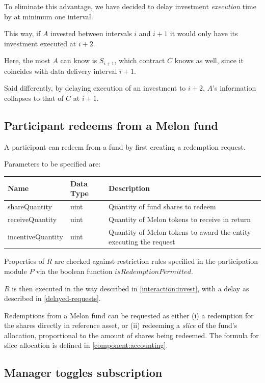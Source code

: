 \documentclass[conference]{IEEEtran}
\begin{document}
To eliminate this advantage, we have decided to delay investment \textit{execution} time by at minimum one interval.

This way, if $A$ invested between intervals $i$ and $i+1$ it would only have its investment executed at $i+2$.

Here, the most $A$ can know is $S_{i+1}$, which contract $C$ knows as well, since it coincides with data delivery interval $i+1$.

Said differently, by delaying execution of an investment to $i+2$, $A$'s information collapses to that of $C$ at $i+1$.

\subsection{Participant redeems from a Melon fund} \label{interaction:redeem}

A participant can redeem from a fund by first creating a redemption request.

Parameters to be specified are:

\begin{center}
		\footnotesize
		\begin{tabular}{ | p{2cm} | p{1.2cm} | p{4cm} | }
		\hline
		Name & Data Type & Description \\ \hline
		shareQuantity & uint & Quantity of fund shares to redeem \\ \hline
		receiveQuantity & uint & Quantity of Melon tokens to receive in return \\ \hline
		incentiveQuantity & uint & Quantity of Melon tokens to award the entity executing the request \\ \hline
	\end{tabular}
\end{center}

Properties of $R$ are checked against restriction rules specified in the participation module $P$ via the boolean function $isRedemptionPermitted$.

$R$ is then executed in the way described in \ref{interaction:invest}, with a delay as described in \ref{delayed-requests}.

Redemptions from a Melon fund can be requested as either (i) a redemption for the shares directly in reference asset, or (ii) redeeming a \textit{slice} of the fund's allocation, proportional to the amount of shares being redeemed.
The formula for slice allocation is defined in \ref{component:accounting}.

\subsection{Manager toggles subscription}
\end{document}
